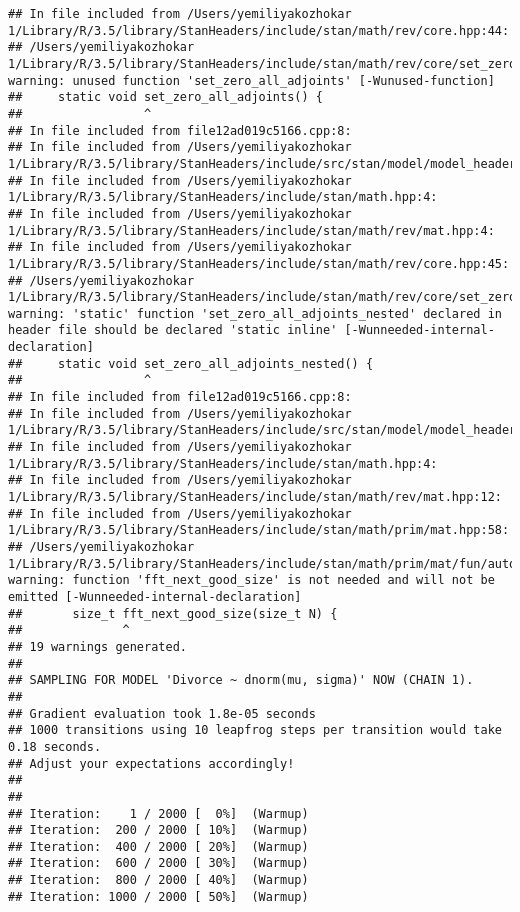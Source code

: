 \documentclass[]{article}
\begin{document}
\begin{verbatim}
## In file included from /Users/yemiliyakozhokar 1/Library/R/3.5/library/StanHeaders/include/stan/math/rev/core.hpp:44:
## /Users/yemiliyakozhokar 1/Library/R/3.5/library/StanHeaders/include/stan/math/rev/core/set_zero_all_adjoints.hpp:14:17: warning: unused function 'set_zero_all_adjoints' [-Wunused-function]
##     static void set_zero_all_adjoints() {
##                 ^
## In file included from file12ad019c5166.cpp:8:
## In file included from /Users/yemiliyakozhokar 1/Library/R/3.5/library/StanHeaders/include/src/stan/model/model_header.hpp:4:
## In file included from /Users/yemiliyakozhokar 1/Library/R/3.5/library/StanHeaders/include/stan/math.hpp:4:
## In file included from /Users/yemiliyakozhokar 1/Library/R/3.5/library/StanHeaders/include/stan/math/rev/mat.hpp:4:
## In file included from /Users/yemiliyakozhokar 1/Library/R/3.5/library/StanHeaders/include/stan/math/rev/core.hpp:45:
## /Users/yemiliyakozhokar 1/Library/R/3.5/library/StanHeaders/include/stan/math/rev/core/set_zero_all_adjoints_nested.hpp:17:17: warning: 'static' function 'set_zero_all_adjoints_nested' declared in header file should be declared 'static inline' [-Wunneeded-internal-declaration]
##     static void set_zero_all_adjoints_nested() {
##                 ^
## In file included from file12ad019c5166.cpp:8:
## In file included from /Users/yemiliyakozhokar 1/Library/R/3.5/library/StanHeaders/include/src/stan/model/model_header.hpp:4:
## In file included from /Users/yemiliyakozhokar 1/Library/R/3.5/library/StanHeaders/include/stan/math.hpp:4:
## In file included from /Users/yemiliyakozhokar 1/Library/R/3.5/library/StanHeaders/include/stan/math/rev/mat.hpp:12:
## In file included from /Users/yemiliyakozhokar 1/Library/R/3.5/library/StanHeaders/include/stan/math/prim/mat.hpp:58:
## /Users/yemiliyakozhokar 1/Library/R/3.5/library/StanHeaders/include/stan/math/prim/mat/fun/autocorrelation.hpp:17:14: warning: function 'fft_next_good_size' is not needed and will not be emitted [-Wunneeded-internal-declaration]
##       size_t fft_next_good_size(size_t N) {
##              ^
## 19 warnings generated.
## 
## SAMPLING FOR MODEL 'Divorce ~ dnorm(mu, sigma)' NOW (CHAIN 1).
## 
## Gradient evaluation took 1.8e-05 seconds
## 1000 transitions using 10 leapfrog steps per transition would take 0.18 seconds.
## Adjust your expectations accordingly!
## 
## 
## Iteration:    1 / 2000 [  0%]  (Warmup)
## Iteration:  200 / 2000 [ 10%]  (Warmup)
## Iteration:  400 / 2000 [ 20%]  (Warmup)
## Iteration:  600 / 2000 [ 30%]  (Warmup)
## Iteration:  800 / 2000 [ 40%]  (Warmup)
## Iteration: 1000 / 2000 [ 50%]  (Warmup)

\end{verbatim}
\end{document}
